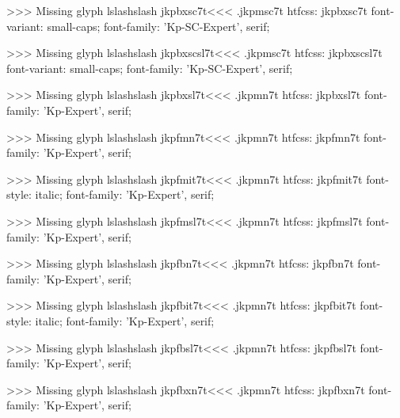 >>>
Missing glyph	lslashslash
\<jkpbxsc7t\><<<
.jkpmsc7t
htfcss:  jkpbxsc7t  font-variant: small-caps; font-family: 'Kp-SC-Expert', serif;

>>>
Missing glyph	lslashslash
\<jkpbxscsl7t\><<<
.jkpmsc7t
htfcss:  jkpbxscsl7t  font-variant: small-caps; font-family: 'Kp-SC-Expert', serif;

>>>
Missing glyph	lslashslash
\<jkpbxsl7t\><<<
.jkpmn7t
htfcss:  jkpbxsl7t  font-family: 'Kp-Expert', serif;

>>>
Missing glyph	lslashslash
\<jkpfmn7t\><<<
.jkpmn7t
htfcss:  jkpfmn7t  font-family: 'Kp-Expert', serif;

>>>
Missing glyph	lslashslash
\<jkpfmit7t\><<<
.jkpmn7t
htfcss:  jkpfmit7t  font-style: italic; font-family: 'Kp-Expert', serif;

>>>
Missing glyph	lslashslash
\<jkpfmsl7t\><<<
.jkpmn7t
htfcss:  jkpfmsl7t  font-family: 'Kp-Expert', serif;

>>>
Missing glyph	lslashslash
\<jkpfbn7t\><<<
.jkpmn7t
htfcss:  jkpfbn7t  font-family: 'Kp-Expert', serif;

>>>
Missing glyph	lslashslash
\<jkpfbit7t\><<<
.jkpmn7t
htfcss:  jkpfbit7t  font-style: italic; font-family: 'Kp-Expert', serif;

>>>
Missing glyph	lslashslash
\<jkpfbsl7t\><<<
.jkpmn7t
htfcss:  jkpfbsl7t  font-family: 'Kp-Expert', serif;

>>>
Missing glyph	lslashslash
\<jkpfbxn7t\><<<
.jkpmn7t
htfcss:  jkpfbxn7t  font-family: 'Kp-Expert', serif;

